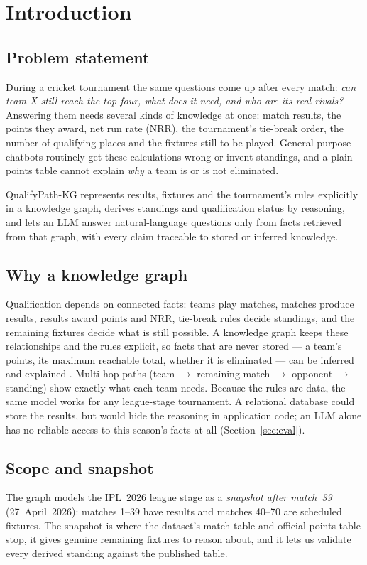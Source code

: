 \section{Introduction}

\subsection{Problem statement}
During a cricket tournament the same questions come up after every match: \emph{can team X still reach the
top four, what does it need, and who are its real rivals?} Answering them needs several kinds of knowledge at
once: match results, the points they award, net run rate (NRR), the tournament's tie-break order, the number
of qualifying places and the fixtures still to be played. General-purpose chatbots routinely get these
calculations wrong or invent standings, and a plain points table cannot explain \emph{why} a team is or is not
eliminated.

QualifyPath-KG represents results, fixtures and the tournament's rules explicitly in a knowledge graph,
derives standings and qualification status by reasoning, and lets an LLM answer natural-language questions
only from facts retrieved from that graph, with every claim traceable to stored or inferred knowledge.

\subsection{Why a knowledge graph}
Qualification depends on connected facts: teams play matches, matches produce results, results award points
and NRR, tie-break rules decide standings, and the remaining fixtures decide what is still possible. A
knowledge graph keeps these relationships and the rules explicit, so facts that are never stored --- a team's
points, its maximum reachable total, whether it is eliminated --- can be inferred and explained
\citep{hogan2021knowledge}. Multi-hop paths (team $\rightarrow$ remaining match $\rightarrow$ opponent
$\rightarrow$ standing) show exactly what each team needs. Because the rules are data, the same model works for
any league-stage tournament. A relational database could store the results, but would hide the reasoning in
application code; an LLM alone has no reliable access to this season's facts at all (Section~\ref{sec:eval}).

\subsection{Scope and snapshot}
The graph models the IPL~2026 league stage as a \emph{snapshot after match~39} (27~April~2026): matches 1--39
have results and matches 40--70 are scheduled fixtures. The snapshot is where the dataset's match table and
official points table stop, it gives genuine remaining fixtures to reason about, and it lets us validate every
derived standing against the published table.

